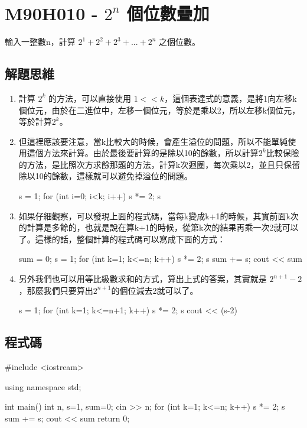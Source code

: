 \section{M90H010 - $2^{n}$ 個位數疊加}
輸入一整數n，計算 $2^{1}+2^{2}+2^{3}+...+2^{n}$ 之個位數。


\subsection{解題思維}
\begin{enumerate}
\item 計算 $2^k$ 的方法，可以直接使用 $1<<k$，這個表達式的意義，是將1向左移k個位元，由於在二進位中，左移一個位元，等於是乘以2，所以左移k個位元，等於計算$2^k$。
\item 但這裡應該要注意，當k比較大的時候，會產生溢位的問題，所以不能單純使用這個方法來計算。由於最後要計算的是除以10的餘數，所以計算$2^k$比較保險的方法，是比照次方求餘那題的方法，計算k次迴圈，每次乘以2，並且只保留除以10的餘數，這樣就可以避免掉溢位的問題。
	\begin{inside}
		s = 1;
		for (int i=0; i<k; i++) {
			s *= 2;
			s %
		}
	\end{inside}
\item 如果仔細觀察，可以發現上面的程式碼，當每k變成k+1的時候，其實前面k次的計算是多餘的，也就是說在算k+1的時候，從第k次的結果再乘一次2就可以了。這樣的話，整個計算的程式碼可以寫成下面的方式：
	\begin{inside}
		sum = 0;
		s = 1;
		for (int k=1; k<=n; k++) {
			s *= 2;
			s %
			sum += s;
		}
		cout << sum %
	\end{inside}
\item 另外我們也可以用等比級數求和的方式，算出上式的答案，其實就是 $2^{n+1}-2$，那麼我們只要算出$2^{n+1}$的個位減去2就可以了。
	\begin{inside}
		s = 1;
		for (int k=1; k<=n+1; k++) {
			s *= 2;
			s %
		}
		cout << (s-2)%
	\end{inside}
\end{enumerate}

\subsection{程式碼}
\begin{cppcode}
	#include <iostream>

	using namespace std;
	
	int main()
	{
		int n, s=1, sum=0;
		cin >> n;
		for (int k=1; k<=n; k++) {
			s *= 2;
			s %
			sum += s;
		}
		cout << sum %
		return 0;
	}
\end{cppcode}

